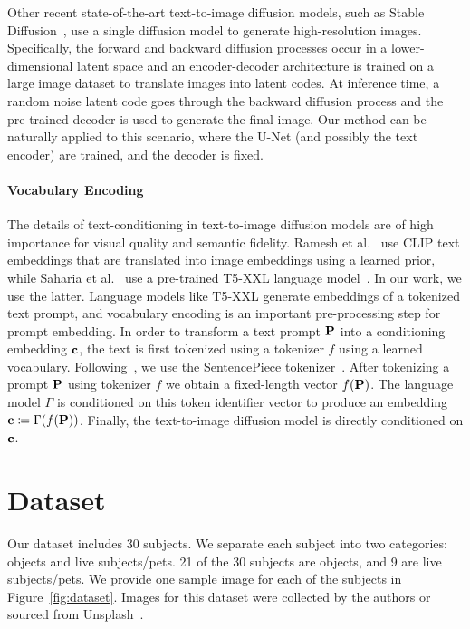 Other recent state-of-the-art text-to-image diffusion models, such as Stable Diffusion~\cite{rombach2022high}, use a single diffusion model to generate high-resolution images. Specifically, the forward and backward diffusion processes occur in a lower-dimensional latent space and an encoder-decoder architecture is trained on a large image dataset to translate images into latent codes. At inference time, a random noise latent code goes through the backward diffusion process and the pre-trained decoder is used to generate the final image. Our method can be naturally applied to this scenario, where the U-Net (and possibly the text encoder) are trained, and the decoder is fixed.

\paragraph{Vocabulary Encoding}
The details of text-conditioning in text-to-image diffusion models are of high importance for visual quality and semantic fidelity. Ramesh et al.~\cite{ramesh2022hierarchical} use CLIP text embeddings that are translated into image embeddings using a learned prior, while Saharia et al.~\cite{saharia2022photorealistic} use a pre-trained T5-XXL language model~\cite{raffel2020exploring}. In our work, we use the latter. 
Language models like T5-XXL generate embeddings of a tokenized text prompt, and vocabulary encoding is an important pre-processing step for prompt embedding. In order to transform a text prompt $\mathbf{P}$ into a conditioning embedding $\mathbf{c}$, the text is first tokenized using a tokenizer $f$ using a learned vocabulary. Following~\cite{saharia2022photorealistic}, we use the SentencePiece tokenizer~\cite{kudo2018sentencepiece}. After tokenizing a prompt $\mathbf{P}$ using tokenizer $f$ we obtain a fixed-length vector $f(\mathbf{P})$. The language model $\Gamma$ is conditioned on this token identifier vector to produce an embedding $\mathbf{c} \coloneqq \Gamma(f(\mathbf{P}))$. Finally, the text-to-image diffusion model is directly conditioned on $\mathbf{c}$.

\section*{Dataset}
Our dataset includes 30 subjects. We separate each subject into two categories: objects and live subjects/pets. 21 of the 30 subjects are objects, and 9 are live subjects/pets. We provide one sample image for each of the subjects in Figure~\ref{fig:dataset}. Images for this dataset were collected by the authors or sourced from Unsplash~\cite{unsplash}.

